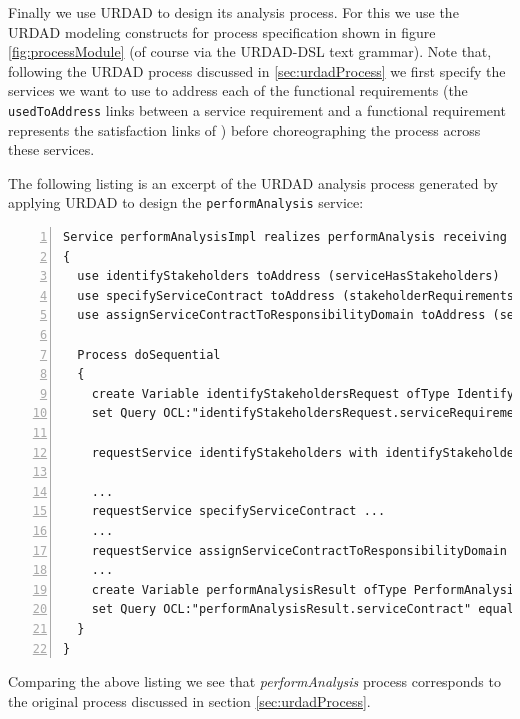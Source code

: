 Finally we use URDAD to design its analysis process. For this we use the URDAD modeling constructs for process specification shown in figure \ref{fig:processModule} (of course via the URDAD-DSL text grammar). Note that, following the URDAD process discussed in \ref{sec:urdadProcess} we first specify the services we want to use to address each of the functional requirements (the \verb+usedToAddress+ links between a service requirement and a functional requirement represents the satisfaction links of \cite{ramesh_toward_2001}) before choreographing the process across these services. 

The following listing is an excerpt of the URDAD analysis process generated by applying URDAD to design the \verb+performAnalysis+ service:
\lstset{language=urdad,caption=Specifying the performAnalysis service in the textual URDAD DSL syntax.,label=serviceTextSyntax}
\begin{lstlisting}[numbers=left,escapechar=|]
Service performAnalysisImpl realizes performAnalysis receiving Variable performAnalysisRequest ofType PerformAnalysisRequest 
{
  use identifyStakeholders toAddress (serviceHasStakeholders) 
  use specifyServiceContract toAddress (stakeholderRequirementsConsistent serviceContractSpecified)
  use assignServiceContractToResponsibilityDomain toAddress (serviceContractAssignedToResponsibilityDomain)
 
  Process doSequential
  {
    create Variable identifyStakeholdersRequest ofType IdentifyStakeholdersRequest
    set Query OCL:"identifyStakeholdersRequest.serviceRequirements" equalTo Query OCL:"performAnalysisRequest.serviceRequirements"
    
    requestService identifyStakeholders with identifyStakeholdersRequest yielding Variable identifyStakeholdersResult ofType IdentifyStakeholdersResult on NoStakeholdersException raiseException NoStakeholdersException

    ...
    requestService specifyServiceContract ...
    ...
    requestService assignServiceContractToResponsibilityDomain ...
    ...
    create Variable performAnalysisResult ofType PerformAnalysisResult
    set Query OCL:"performAnalysisResult.serviceContract" equalTo Query OCL:"specifyServiceContractResult.serviceContract"  
  }                              
}
\end{lstlisting}

Comparing the above listing we see that \emph{performAnalysis} process corresponds to the original process discussed in section \ref{sec:urdadProcess}.